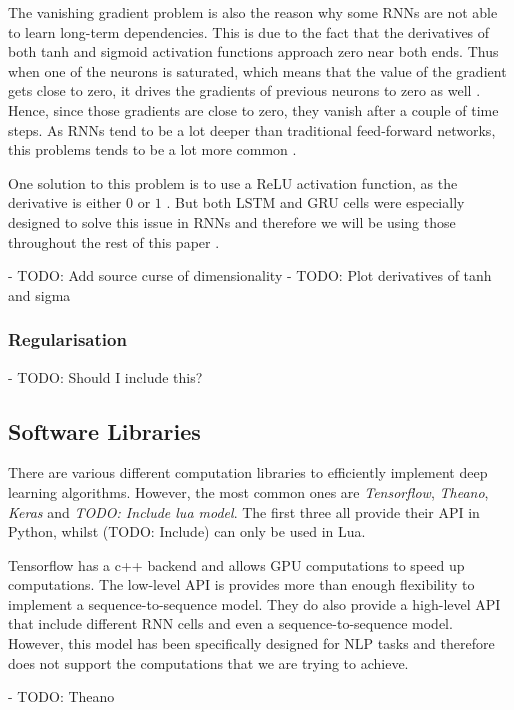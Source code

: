 The vanishing gradient problem is also the reason why some RNNs are not able to learn long-term dependencies.
This is due to the fact that the derivatives of both tanh and sigmoid activation functions approach zero near both ends.
Thus when one of the neurons is saturated, which means that the value of the gradient gets close to zero, it drives the gradients of previous neurons to zero as well \cite{britz_2016}.
Hence, since those gradients are close to zero, they vanish after a couple of time steps.
As RNNs tend to be a lot deeper than traditional feed-forward networks, this problems tends to be a lot more common \cite{britz_2016}.

One solution to this problem is to use a ReLU activation function, as the derivative is either $0$ or $1$ \cite{britz_2016}.
But both LSTM and GRU cells were especially designed to solve this issue in RNNs and therefore we will be using those throughout the rest of this paper \cite{LSTM,hochreiter1997long,cho2014learning}.

- TODO: Add source curse of dimensionality
- TODO: Plot derivatives of tanh and sigma

\subsubsection{Regularisation}

- TODO: Should I include this?

\subsection{Software Libraries}

There are various different computation libraries to efficiently implement deep learning algorithms.
However, the most common ones are \textit{Tensorflow}, \textit{Theano}, \textit{Keras} and \textit{TODO: Include lua model}.
The first three all provide their API in Python, whilst (TODO: Include) can only be used in Lua.

Tensorflow has a c++ backend and allows GPU computations to speed up computations.
The low-level API is provides more than enough flexibility to implement a sequence-to-sequence model.
They do also provide a high-level API that include different RNN cells and even a sequence-to-sequence model.
However, this model has been specifically designed for NLP tasks and therefore does not support the computations that we are trying to achieve.

- TODO: Theano

